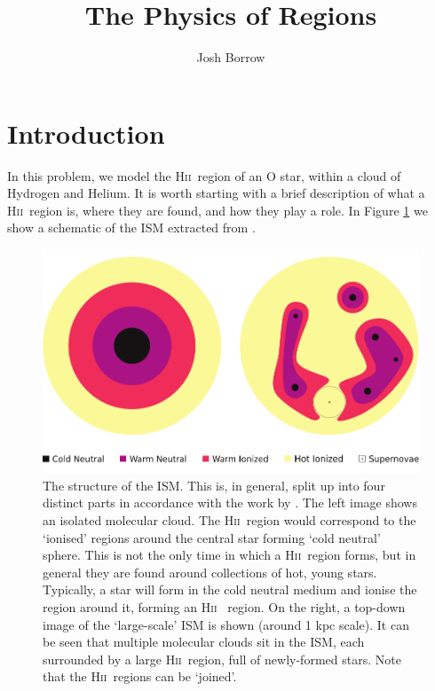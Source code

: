 \documentclass[a4paper]{article}
\title{The Physics of \hii Regions}\label{the-physics-of-hii-regions}
\author{Josh Borrow}
\newcommand{\hii}{H\textsc{ii}~}
\begin{document}
\maketitle

\section{Introduction}

In this problem, we model the \hii region of an O star, within a cloud of
Hydrogen and Helium. It is worth starting with a brief description of what a
\hii region is, where they are found, and how they play a role. In Figure
\ref{fig:hiidiagram} we show a schematic of the ISM extracted from
\citet{borrow_towards_2017}.

\begin{figure}[!h]
    \centering
    \includegraphics[width=\textwidth]{structure.pdf}
    \caption{The structure of the ISM. This is, in general, split up into four
        distinct parts in accordance with the work by
        \citet{mckee_theory_1977}.  The left image shows an isolated molecular
        cloud. The \hii region would correspond to the `ionised' regions around
        the central star forming `cold neutral' sphere. This is not the only
        time in which a \hii region forms, but in general they are found around
        collections of hot, young stars. Typically, a star will form in the
        cold neutral medium and ionise the region around it, forming an \hii
        region. On the right, a top-down image of the `large-scale' ISM is
        shown (around 1 kpc scale). It can be seen that multiple molecular
        clouds sit in the ISM, each surrounded by a large \hii region, full of
        newly-formed stars. Note that the \hii regions can be `joined'.}
    \label{fig:hiidiagram}
\end{figure}
\end{document}

